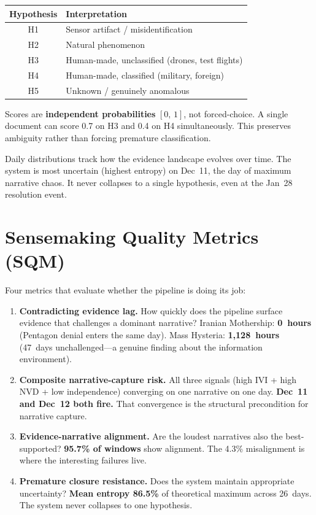 \documentclass[11pt, letterpaper]{article}
\begin{document}
\begin{table}[h]
\centering
\begin{tabular}{@{}cl@{}}
  \toprule
  \textbf{Hypothesis} & \textbf{Interpretation} \\
  \midrule
  H1 & Sensor artifact / misidentification \\
  H2 & Natural phenomenon \\
  H3 & Human-made, unclassified (drones, test flights) \\
  H4 & Human-made, classified (military, foreign) \\
  H5 & Unknown / genuinely anomalous \\
  \bottomrule
\end{tabular}
\end{table}

Scores are \textbf{independent probabilities} $[0,\,1]$, not forced-choice.
A single document can score 0.7 on H3 and 0.4 on H4 simultaneously.
This preserves ambiguity rather than forcing premature classification.

Daily distributions track how the evidence landscape evolves over time.
The system is most uncertain (highest entropy) on Dec~11, the day of maximum narrative chaos.
It never collapses to a single hypothesis, even at the Jan~28 resolution event.


\section{Sensemaking Quality Metrics (SQM)}

Four metrics that evaluate whether the pipeline is doing its job:

\begin{enumerate}
  \item \textbf{Contradicting evidence lag.}
    How quickly does the pipeline surface evidence that challenges a dominant narrative?
    Iranian Mothership: \textbf{0~hours} (Pentagon denial enters the same day).
    Mass Hysteria: \textbf{1,128~hours} (47~days unchallenged---a genuine finding about the information environment).

  \item \textbf{Composite narrative-capture risk.}
    All three signals (high IVI + high NVD + low independence) converging on one narrative on one day.
    \textbf{Dec~11 and Dec~12 both fire.}
    That convergence is the structural precondition for narrative capture.

  \item \textbf{Evidence-narrative alignment.}
    Are the loudest narratives also the best-supported?
    \textbf{95.7\% of windows} show alignment.
    The 4.3\% misalignment is where the interesting failures live.

  \item \textbf{Premature closure resistance.}
    Does the system maintain appropriate uncertainty?
    \textbf{Mean entropy 86.5\%} of theoretical maximum across 26~days.
    The system never collapses to one hypothesis.
\end{enumerate}
\end{document}
